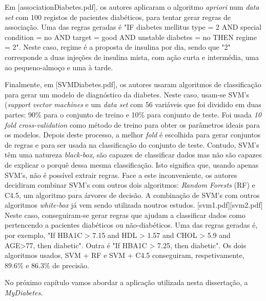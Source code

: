 Em [associationDiabetes.pdf], os autores aplicaram o algoritmo \textit{apriori} num \textit{data set} com 100 registos de pacientes diabéticos, para tentar gerar regras de associação. Uma das regras geradas é "IF diabetes mellitus type = 2 AND special condition = no AND target = good AND unstable diabetes = no THEN regime = 2". Neste caso, regime é a proposta de insulina por dia, sendo que "2" corresponde a duas injeções de insulina mista, com ação curta e intermédia, uma ao pequeno-almoço e uma à tarde. 

Finalmente, em [SVMDiabetes.pdf], os autores usaram algoritmos de classificação para gerar um modelo de diagnóstico da diabetes. Neste caso, usam-se SVM's (\textit{support vector machines} e um \textit{data set} com 56 variáveis que foi dividido em duas partes: 90\% para o conjunto de treino e 10\% para conjunto de teste. Foi usada \textit{10 fold cross-validation} como método de treino para obter os parâmetros ideais para os modelos. Depois deste processo, a melhor \textit{fold} é escolhida para gerar conjuntos de regras e para ser usada na classificação do conjunto de teste. Contudo, SVM's têm uma natureza \textit{black-box}, são capazes de classificar dados mas não são capazes de explicar o porquê dessa mesma classificação. Isto significa que, usando apenas SVM's, não é possível extrair regras. Face a este inconveniente, os autores decidiram combinar SVM's com outros dois algoritmos: \textit{Random Forests} (RF) e C4.5, um algoritmo para árvores de decisão. A combinação de SVM's com outros algoritmos \textit{white-box} já vem sendo utilizada noutros estudos. [svm1.pdf][svm2.pdf] Neste caso, conseguiram-se gerar regras que ajudam a classificar dados como pertencendo a pacientes diabéticos ou não-diabéticos. Uma das regras geradas é, por exemplo,  "If HBA1C > 7.15 and HDL > 1.57 and CHOL > 5.9 and AGE>77, then diabetic". 
Outra é "If HBA1C > 7.25, then diabetic". Os dois algoritmos usados, SVM + RF e SVM + C4.5 conseguiram, respetivamente, 89.6\% e 86.3\% de precisão.

No próximo capítulo vamos abordar a aplicação utilizada nesta dissertação, a \textit{MyDiabetes}.






